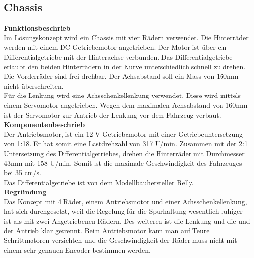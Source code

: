 \subsection{Chassis}

\textbf{Funktionsbeschrieb}
\\[0.2cm]
Im Lösungskonzept wird ein Chassis mit vier Rädern verwendet. Die Hinterräder werden mit einem DC-Getriebemotor angetrieben. Der Motor ist über ein Differentialgetriebe mit der Hinterachse verbunden. Das Differentialgetriebe erlaubt den beiden Hinterrädern in der Kurve unterschiedlich schnell zu drehen. Die Vorderräder sind frei drehbar. Der Achsabstand soll ein Mass von 160mm nicht überschreiten.\\
Für die Lenkung wird eine Achsschenkellenkung verwendet. Diese wird mittels einem Servomotor angetrieben. Wegen dem maximalen Achsabstand von 160mm ist der Servomotor zur Antrieb der Lenkung vor dem Fahrzeug verbaut. \\[0.2cm]
\textbf{Komponentenbeschrieb}
\\[0.2cm]
Der Antriebsmotor, ist ein 12 V Getriebemotor mit einer Getriebeuntersetzung von 1:18. Er hat somit eine Lastdrehzahl von 317 U/min. Zusammen mit der 2:1 Untersetzung des Differentialgetriebes, drehen die Hinterräder mit Durchmesser 43mm mit 158 U/min. Somit ist die maximale Geschwindigkeit des Fahrzeuges bei 35 cm/s.\\
Das Differentialgetriebe ist von dem Modellbauhersteller Relly. \\[0.2cm]
\textbf{Begründung}
\\[0.2cm]
Das Konzept mit 4 Räder, einem Antriebsmotor und einer Achsschenkellenkung, hat sich durchgesetzt, weil die Regelung für die Spurhaltung wesentlich ruhiger ist als mit zwei Angetriebenen Rädern. Des weiteren ist die Lenkung und die und der Antrieb klar getrennt. Beim Antriebsmotor kann man auf Teure Schrittmotoren verzichten und die Geschwindigkeit der Räder muss nicht mit einem sehr genauen Encoder bestimmen werden.